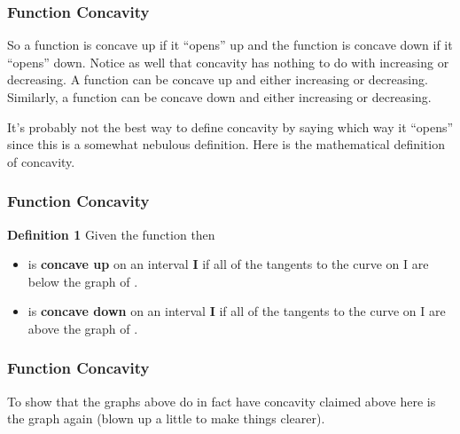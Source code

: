 \documentclass{beamer}
\begin{document}
\begin{frame} 
 \frametitle{Function Concavity}
 So a function is concave up if it “opens” up and the function is concave down if it “opens” down.  Notice as well that concavity has nothing to do with increasing or decreasing.  A function can be concave up and either increasing or decreasing.  Similarly, a function can be concave down and either increasing or decreasing.
 
 It’s probably not the best way to define concavity by saying which way it “opens” since this is a somewhat nebulous definition.  Here is the mathematical definition of concavity.
\end{frame}
\begin{frame}
 \frametitle{Function Concavity}
 \textbf{ Definition 1 }
 Given the function  then
 
 \begin{itemize}
\item is \textbf{concave up} on an interval \textbf{I} if all of the tangents to the curve on I are below the graph of .
 
\item is \textbf{concave down} on an interval \textbf{I} if all of the tangents to the curve on I are above the graph of .
 \end{itemize}
\end{frame}
\begin{frame} 
	\frametitle{Function Concavity}
 
 To show that the graphs above do in fact have concavity claimed above here is the graph again (blown up a little to make things clearer).
\end{frame}
\end{document}
